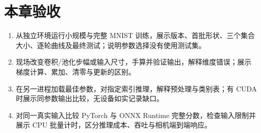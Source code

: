 \section{本章验收}
\begin{enumerate}
  \item 从独立环境运行小规模与完整 MNIST 训练，展示版本、首批形状、三个集合大小、逐轮曲线及最终测试；说明参数选择没有使用测试集。
  \item 现场改变卷积/池化步幅或输入尺寸，手算并验证输出，解释维度错误；展示梯度计算、累加、清零与更新的区别。
  \item 在另一进程加载最佳参数，对指定索引推理，解释预处理与类别表；有 CUDA 时展示同参数输出比较，无设备如实记录缺口。
  \item 对同一真实输入比较 PyTorch 与 ONNX Runtime 完整分数，检查输入限制并展示 CPU 批量计时，区分推理成本、吞吐与相机端到端响应。
\end{enumerate}
